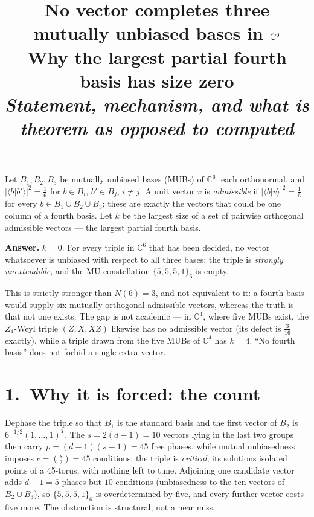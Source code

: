 \documentclass[10pt]{article}
\title{\bfseries No vector completes three mutually unbiased bases in $\C^6$\\[4pt]
\large\normalfont Why the largest partial fourth basis has size zero\\[2pt]
\normalsize\itshape Statement, mechanism, and what is theorem as opposed to computed}
\author{}
\date{}
\newcommand{\C}{\mathbb{C}}
\newcommand{\abs}[1]{\lvert #1\rvert}
\newcommand{\ip}[2]{\langle #1|#2\rangle}
\begin{document}
\maketitle
\vspace{-2em}

Let $B_1,B_2,B_3$ be mutually unbiased bases (MUBs) of $\C^6$: each orthonormal, and
$\abs{\ip{b}{b'}}^2=\tfrac16$ for $b\in B_i$, $b'\in B_j$, $i\neq j$. A unit vector $v$ is
\emph{admissible} if $\abs{\ip{b}{v}}^2=\tfrac16$ for every $b\in B_1\cup B_2\cup B_3$; these are exactly
the vectors that could be one column of a fourth basis. Let $k$ be the largest size of a set of pairwise
orthogonal admissible vectors --- the largest partial fourth basis.

\begin{tcolorbox}[colback=blue!4,colframe=blue!45!black,boxrule=0.6pt,arc=2pt,left=6pt,right=6pt,top=3pt,bottom=3pt]
\textbf{Answer.} $k=0$. For every triple in $\C^6$ that has been decided, no vector whatsoever is
unbiased with respect to all three bases: the triple is \emph{strongly unextendible}, and the MU
constellation $\{5,5,5,1\}_6$ is empty.
\end{tcolorbox}

This is strictly stronger than $N(6)=3$, and not equivalent to it: a fourth basis would supply six
mutually orthogonal admissible vectors, whereas the truth is that not one exists. The gap is not
academic --- in $\C^4$, where five MUBs exist, the $Z_4$-Weyl triple $(Z,X,XZ)$ likewise has no
admissible vector (its defect is $\tfrac{3}{16}$ exactly), while a triple drawn from the five MUBs of
$\C^4$ has $k=4$. ``No fourth basis'' does not forbid a single extra vector.

\section*{1.\ Why it is forced: the count}

Dephase the triple so that $B_1$ is the standard basis and the first vector of $B_2$ is
$6^{-1/2}(1,\dots,1)^{T}$. The $s=2(d-1)=10$ vectors lying in the last two groups then carry
$p=(d-1)(s-1)=45$ free phases, while mutual unbiasedness imposes $c=\binom{s}{2}=45$ conditions: the
triple is \emph{critical}, its solutions isolated points of a 45-torus, with nothing left to tune.
Adjoining one candidate vector adds $d-1=5$ phases but $10$ conditions (unbiasedness to the ten vectors
of $B_2\cup B_3$), so $\{5,5,5,1\}_6$ is overdetermined by five, and every further vector costs five
more. The obstruction is structural, not a near miss.
\end{document}
